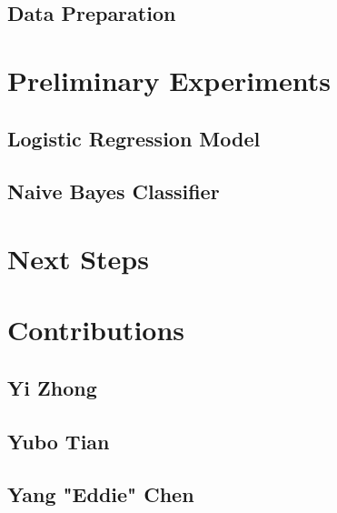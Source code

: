 \documentclass[paper=a4, fontsize=11pt]{scrartcl} %
\numberwithin{equation}{section} %
\numberwithin{figure}{section} %
\numberwithin{table}{section} %
\begin{document}
\subsection{Data Preparation}


\section{Preliminary Experiments}
\subsection{Logistic Regression Model}
\subsection{Naive Bayes Classifier}


\section{Next Steps}


\section{Contributions}
\subsection{Yi Zhong}
\subsection{Yubo Tian}
\subsection{Yang "Eddie" Chen}
\end{document}
